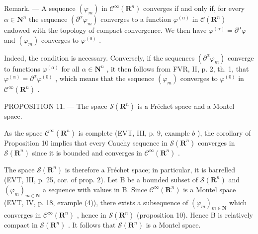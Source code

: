 Remark. --- A sequence \((\varphi_{m})\) in \(\mathcal{C}^{\infty}(\mathbf{R}^{n})\) converges if and only if, for every \(\alpha\in \mathbf{N}^{n}\) the sequence \((\partial^{\alpha}\varphi_{m})\) converges to a function \(\varphi^{(\alpha)}\) in \(\mathcal{C}(\mathbf{R}^{n})\) endowed with the topology of compact convergence. We then have \(\varphi^{(\alpha)}=\partial^{\alpha}\varphi\) and \((\varphi_{m})\) converges to \(\varphi^{(0)}\) .

Indeed, the condition is necessary. Conversely, if the sequences \((\partial^{\alpha}\varphi_{m})\) converge to functions \(\varphi^{(\alpha)}\) for all \(\alpha\in \mathbf{N}^{n}\) , it then follows from FVR, II, p. 2, th. 1, that \(\varphi^{(\alpha)}=\partial^{\alpha}\varphi^{(0)}\) , which means that the sequence \((\varphi_{m})\) converges to \(\varphi^{(0)}\) in \(\mathcal{C}^{\infty}(\mathbf{R}^{n})\) .

PROPOSITION 11. --- The space \(\mathcal{S}(\mathbf{R}^{n})\) is a Fréchet space and a Montel space.

As the space \(\mathcal{C}^{\infty}(\mathbf{R}^{n})\) is complete (EVT, III, p. 9, example \(b\) ), the corollary of Proposition 10 implies that every Cauchy sequence in \(\mathcal{S}(\mathbf{R}^{n})\) converges in \(\mathcal{S}(\mathbf{R}^{n})\) since it is bounded and converges in \(\mathcal{C}^{\infty}(\mathbf{R}^{n})\) .

The space \(\mathcal{S}(\mathbf{R}^n)\) is therefore a Fréchet space; in particular, it is barrelled (EVT, III, p. 25, cor. of prop. 2). Let B be a bounded subset of \(\mathcal{S}(\mathbf{R}^n)\) and \((\varphi_m)_{m \in \mathbf{N}}\) a sequence with values in B. Since \(\mathcal{C}^\infty(\mathbf{R}^n)\) is a Montel space (EVT, IV, p. 18, example (4)), there exists a subsequence of \((\varphi_m)_{m \in \mathbf{N}}\) which converges in \(\mathcal{C}^\infty(\mathbf{R}^n)\) , hence in \(\mathcal{S}(\mathbf{R}^n)\) (proposition 10). Hence B is relatively compact in \(\mathcal{S}(\mathbf{R}^n)\) . It follows that \(\mathcal{S}(\mathbf{R}^n)\) is a Montel space.

